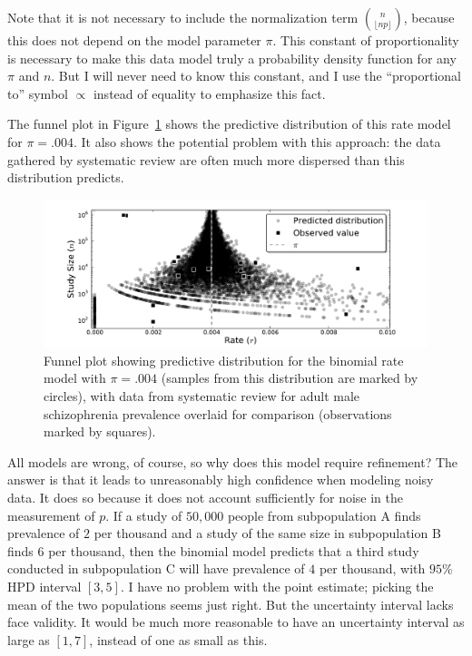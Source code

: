 Note that it is not necessary to include the normalization term
$\binom{n}{\lfloor np\rfloor}$, because this does not depend on the
model parameter $\pi$. This constant of proportionality is necessary
to make this data model truly a probability density function for any
$\pi$ and $n$. But I will never need to know this constant, and I use
the ``proportional to'' symbol $\propto$ instead of equality to
emphasize this fact.

The funnel plot in Figure~\ref{rate-model-binom-funnel} shows the
predictive distribution of this rate model for $\pi=.004$.  It also
shows the potential problem with this approach: the data gathered by
systematic review are often much more dispersed than this distribution
predicts.

\begin{figure}[ht]
\begin{center}
\includegraphics[width=\textwidth]{binomial-model-funnel.pdf}
\end{center}
\caption{Funnel plot showing predictive distribution for the binomial
  rate model with $\pi=.004$ (samples from this distribution are
  marked by circles), with data from systematic review for adult male
  schizophrenia prevalence overlaid for comparison (observations
  marked by squares).}
\label{rate-model-binom-funnel}
\end{figure}

All models are wrong, of course, so why does this model require
refinement? The answer is that it leads to unreasonably high
confidence when modeling noisy data.  It does so because it does not
account sufficiently for noise in the measurement of $p$. If a study
of $50,000$ people from subpopulation A finds prevalence of $2$ per
thousand and a study of the same size in subpopulation B finds $6$ per
thousand, then the binomial model predicts that a third study
conducted in subpopulation C will have prevalence of $4$ per thousand,
with $95\%$ HPD interval $[3,5]$.  I have no problem with the point
estimate; picking the mean of the two populations seems just right.
But the uncertainty interval lacks face validity.  It would be much
more reasonable to have an uncertainty interval as large as $[1,7]$,
instead of one as small as this.

